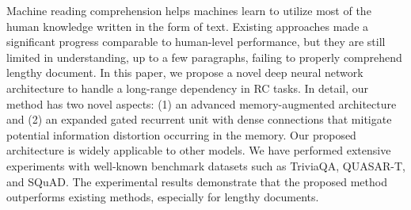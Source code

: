 Machine reading comprehension helps machines learn to utilize most of the human knowledge written in the form of text. Existing approaches made a significant progress comparable to human-level performance, but they are still limited in understanding, up to a few paragraphs, failing to properly comprehend lengthy document. In this paper, we propose a novel deep neural network architecture to handle a long-range dependency in RC tasks. In detail, our method has two novel aspects: (1) an advanced memory-augmented architecture and (2) an expanded gated recurrent unit with dense connections that mitigate potential information distortion occurring in the memory. Our proposed architecture is widely applicable to other models. We have performed extensive experiments with well-known benchmark datasets such as TriviaQA, QUASAR-T, and SQuAD. The experimental results demonstrate that the proposed method outperforms existing methods, especially for lengthy documents.
